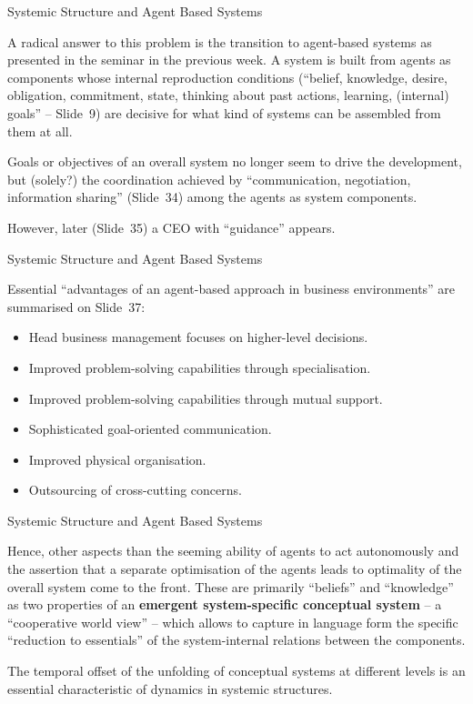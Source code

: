 \documentclass{beamer}
\begin{document}
\begin{frame}{Systemic Structure and Agent Based Systems}

A radical answer to this problem is the transition to agent-based systems as
presented in the seminar in the previous week. A system is built from agents
as components whose internal reproduction conditions (\enquote{belief,
  knowledge, desire, obligation, commitment, state, thinking about past
  actions, learning, (internal) goals} -- Slide~9) are decisive for what kind
of systems can be assembled from them at all.

Goals or objectives of an overall system no longer seem to drive the
development, but (solely?) the coordination achieved by
\enquote{communication, negotiation, information sharing} (Slide~34) among the
agents as system components.

However, later (Slide~35) a CEO with \enquote{guidance} appears.

\end{frame}

\begin{frame}{Systemic Structure and Agent Based Systems}

Essential \enquote{advantages of an agent-based approach in business
  environments} are summarised on Slide~37:
\begin{itemize}
\item Head business management focuses on higher-level decisions.
\item Improved problem-solving capabilities through specialisation.
\item Improved problem-solving capabilities through mutual support.
\item Sophisticated goal-oriented communication.
\item Improved physical organisation.
\item Outsourcing of cross-cutting concerns.
\end{itemize}

\end{frame}

\begin{frame}{Systemic Structure and Agent Based Systems}

Hence, other aspects than the seeming ability of agents to act autonomously
and the assertion that a separate optimisation of the agents leads to
optimality of the overall system come to the front. These are primarily
\enquote{beliefs} and \enquote{knowledge} as two properties of an
\textbf{emergent system-specific conceptual system} -- a \enquote{cooperative
  world view} -- which allows to capture in language form the specific
\enquote{reduction to essentials} of the system-internal relations between the
components.

The temporal offset of the unfolding of conceptual systems at different levels
is an essential characteristic of dynamics in systemic structures.

\end{frame}
\end{document}
